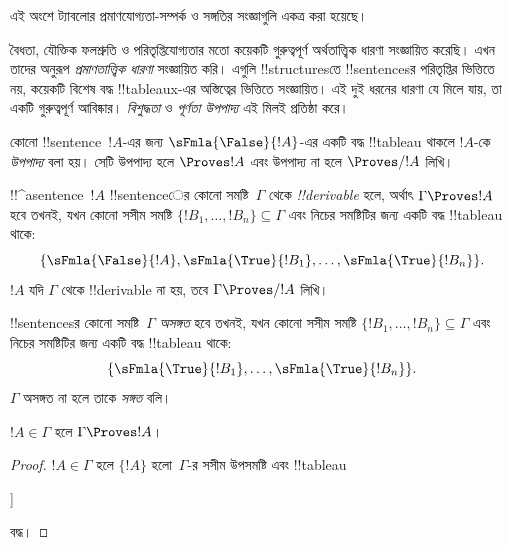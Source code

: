 \documentclass[../../../include/open-logic-section]{subfiles}
\begin{document}
      {}
      {}


\begin{editorial}
এই অংশে ট্যাবলোর প্রমাণযোগ্যতা-সম্পর্ক ও সঙ্গতির সংজ্ঞাগুলি একত্র
করা হয়েছে।
\end{editorial}

\begin{explain}
বৈধতা, যৌক্তিক ফলশ্রুতি ও পরিতৃপ্তিযোগ্যতার মতো কয়েকটি গুরুত্বপূর্ণ
অর্থতাত্ত্বিক ধারণা সংজ্ঞায়িত করেছি। এখন তাদের অনুরূপ
\emph{প্রমাণতাত্ত্বিক ধারণা} সংজ্ঞায়িত করি। এগুলি !!{structure}sতে
!!{sentence}sর পরিতৃপ্তির ভিত্তিতে নয়, কয়েকটি বিশেষ বদ্ধ
!!{tableau}x-এর অস্তিত্বের ভিত্তিতে সংজ্ঞায়িত। এই দুই ধরনের ধারণা যে
মিলে যায়, তা একটি গুরুত্বপূর্ণ আবিষ্কার। \emph{বিশুদ্ধতা} ও
\emph{পূর্ণতা উপপাদ্য} এই মিলই প্রতিষ্ঠা করে।
\end{explain}


\begin{defn}[উপপাদ্য]
কোনো !!{sentence}~$!A$-এর জন্য $\sFmla{\False}{!A}$-এর একটি বদ্ধ
!!{tableau} থাকলে $!A$-কে \emph{উপপাদ্য} বলা হয়। সেটি উপপাদ্য হলে
$\Proves !A$ এবং উপপাদ্য না হলে $\Proves/ !A$ লিখি।
\end{defn}

\begin{defn}[!!^{derivability}]
!!^a{sentence}~$!A$ !!{sentence}ের কোনো সমষ্টি~$\Gamma$ থেকে
\emph{!!{derivable}} হলে, অর্থাৎ $\Gamma \Proves !A$ হবে তখনই, যখন
কোনো সসীম সমষ্টি $\{!B_1, \dots, !B_n\} \subseteq \Gamma$ এবং
নিচের সমষ্টিটির জন্য একটি বদ্ধ !!{tableau} থাকে:
\[
\{
  \sFmla{\False}{!A},
  \sFmla{\True}{!B_1}, \dots,
  \sFmla{\True}{!B_n}
  \}.
\]
$!A$ যদি $\Gamma$ থেকে !!{derivable} না হয়, তবে
$\Gamma \Proves/ !A$ লিখি।
\end{defn}

\begin{defn}[সঙ্গতি]
!!{sentence}sর কোনো সমষ্টি~$\Gamma$ \emph{অসঙ্গত} হবে তখনই, যখন
কোনো সসীম সমষ্টি $\{!B_1, \dots, !B_n\} \subseteq \Gamma$ এবং
নিচের সমষ্টিটির জন্য একটি বদ্ধ !!{tableau} থাকে:
\[
\{
  \sFmla{\True}{!B_1}, \dots,
  \sFmla{\True}{!B_n}
  \}.
\]
$\Gamma$ অসঙ্গত না হলে তাকে \emph{সঙ্গত} বলি।
\end{defn}

\begin{prop}[প্রতিবিম্ব ধর্ম]
$!A \in \Gamma$ হলে $\Gamma \Proves !A$।
\end{prop}

\begin{proof}
$!A \in \Gamma$ হলে $\{!A\}$ হলো~$\Gamma$-র সসীম উপসমষ্টি এবং
!!{tableau}
\begin{oltableau}
  [\sFmla{\False}{\formula{A}}, just = \TAss
    [\sFmla{\True}{\formula{A}}, just = \TAss,close]
  ]
\end{oltableau}
বদ্ধ।
\end{proof}
\end{document}
